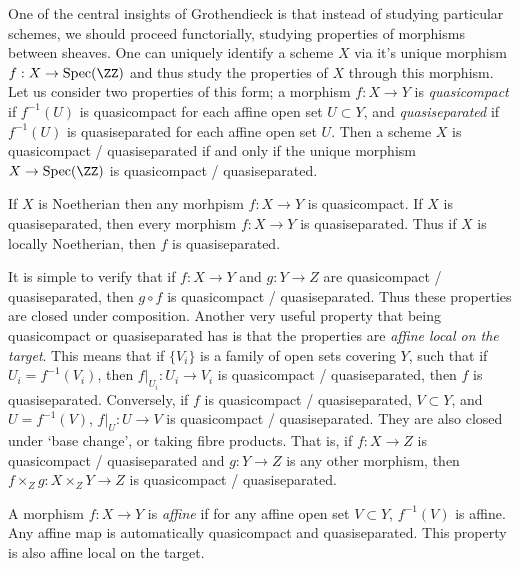 One of the central insights of Grothendieck is that instead of studying particular schemes, we should proceed functorially, studying properties of morphisms between sheaves. One can uniquely identify a scheme $X$ via it's unique morphism $f: X \to \text{Spec}(\ZZ)$ and thus study the properties of $X$ through this morphism. Let us consider two properties of this form; a morphism $f: X \to Y$ is \emph{quasicompact} if $f^{-1}(U)$ is quasicompact for each affine open set $U \subset Y$, and \emph{quasiseparated} if $f^{-1}(U)$ is quasiseparated for each affine open set $U$. Then a scheme $X$ is quasicompact / quasiseparated if and only if the unique morphism $X \to \text{Spec}(\ZZ)$ is quasicompact / quasiseparated.

\begin{lemma}
    If $X$ is Noetherian then any morhpism $f: X \to Y$ is quasicompact. If $X$ is quasiseparated, then every morphism $f: X \to Y$ is quasiseparated. Thus if $X$ is locally Noetherian, then $f$ is quasiseparated.
\end{lemma}

It is simple to verify that if $f: X \to Y$ and $g: Y \to Z$ are quasicompact / quasiseparated, then $g \circ f$ is quasicompact / quasiseparated. Thus these properties are closed under composition. Another very useful property that being quasicompact or quasiseparated has is that the properties are \emph{affine local on the target}. This means that if $\{ V_i \}$ is a family of open sets covering $Y$, such that if $U_i = f^{-1}(V_i)$, then $f|_{U_i}: U_i \to V_i$ is quasicompact / quasiseparated, then $f$ is quasiseparated. Conversely, if $f$ is quasicompact / quasiseparated, $V \subset Y$, and $U = f^{-1}(V)$, $f|_U: U \to V$ is quasicompact / quasiseparated. They are also closed under `base change', or taking fibre products. That is, if $f: X \to Z$ is quasicompact / quasiseparated and $g: Y \to Z$ is any other morphism, then $f \times_Z g: X \times_Z Y \to Z$ is quasicompact / quasiseparated.

A morphism $f: X \to Y$ is \emph{affine} if for any affine open set $V \subset Y$, $f^{-1}(V)$ is affine. Any affine map is automatically quasicompact and quasiseparated. This property is also affine local on the target.

